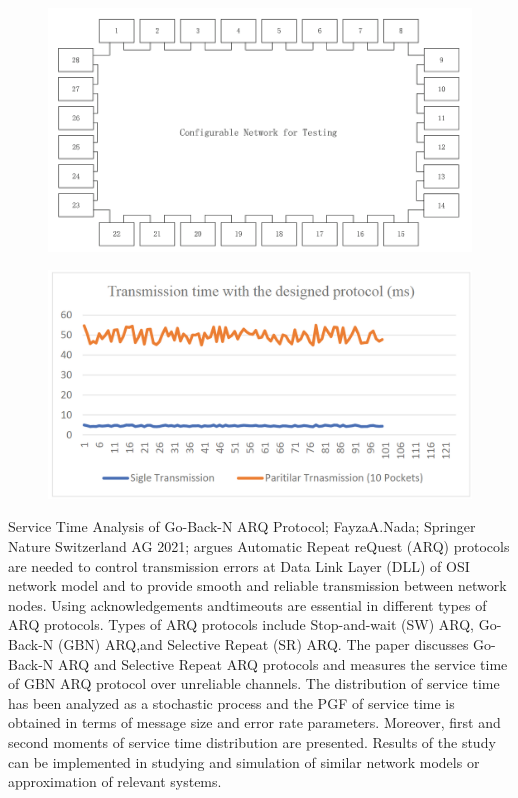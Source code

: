 \documentclass[12pt]{article}
\begin{document}
\begin{figure}[h]
\includegraphics[scale=0.75]{Screenshot 2022-02-28 215019.png} 
\end{figure}
\begin{figure}[h]
\includegraphics[scale=0.75]{Screenshot 2022-02-28 215029.png}
\end{figure}
\newpage
Service Time Analysis of Go-Back-N ARQ Protocol; FayzaA.Nada; Springer Nature Switzerland AG 2021; argues Automatic Repeat reQuest (ARQ) protocols are needed to control transmission errors at Data Link Layer (DLL) of OSI network model and to provide smooth and reliable transmission between network nodes. Using acknowledgements andtimeouts are essential in different types of ARQ protocols. Types of ARQ protocols include Stop-and-wait (SW) ARQ, Go-Back-N (GBN) ARQ,and Selective Repeat (SR) ARQ. The paper discusses Go-Back-N ARQ and Selective Repeat ARQ protocols and measures the service time of GBN ARQ protocol over unreliable channels. The distribution of service time has been analyzed as a stochastic process and the PGF of service time is obtained in terms of message size and error rate parameters. Moreover, first and second moments of service time distribution are presented. Results of the study can be implemented in studying and simulation of similar network models or approximation of relevant systems.
\end{document}
